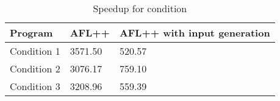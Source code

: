 \begin{table}
\caption{Speedup for condition}
\label{tab:condition_speedup}
\begin{tabular}{lll}
\toprule
Program & AFL++ & AFL++ with input generation \\
\midrule
Condition 1 & 3571.50 & 520.57 \\
Condition 2 & 3076.17 & 759.10 \\
Condition 3 & 3208.96 & 559.39 \\
\bottomrule
\end{tabular}
\end{table}
